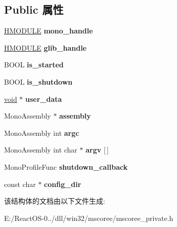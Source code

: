 \subsection*{Public 属性}
\begin{DoxyCompactItemize}
\item 
\mbox{\label{structloaded__mono_a03e35068e42b73f60f08e9fbd91322c6}} 
\hyperlink{interfacevoid}{H\+M\+O\+D\+U\+LE} {\bfseries mono\+\_\+handle}
\item 
\mbox{\label{structloaded__mono_a2002cc65b00678cf402811d2d275a964}} 
\hyperlink{interfacevoid}{H\+M\+O\+D\+U\+LE} {\bfseries glib\+\_\+handle}
\item 
\mbox{\label{structloaded__mono_a7f886657b57a08da32de1821763a6885}} 
B\+O\+OL {\bfseries is\+\_\+started}
\item 
\mbox{\label{structloaded__mono_abcb75500e86ce54e305d48c2e7253903}} 
B\+O\+OL {\bfseries is\+\_\+shutdown}
\item 
\mbox{\label{structloaded__mono_a6e7f0d3fd072b323cf52f0323251b1ca}} 
\hyperlink{interfacevoid}{void} $\ast$ {\bfseries user\+\_\+data}
\item 
\mbox{\label{structloaded__mono_a5015f8ab7cae14e99caaa39a347b5714}} 
Mono\+Assembly $\ast$ {\bfseries assembly}
\item 
\mbox{\label{structloaded__mono_a0bf7db9915e35dadefc0a5eeae747364}} 
Mono\+Assembly int {\bfseries argc}
\item 
\mbox{\label{structloaded__mono_af841ee06b9752bbb0d461ec53c0b527e}} 
Mono\+Assembly int char $\ast$ {\bfseries argv} \mbox{[}$\,$\mbox{]}
\item 
\mbox{\label{structloaded__mono_a22be2db6fa7592262a5c61b93a963dfd}} 
Mono\+Profile\+Func {\bfseries shutdown\+\_\+callback}
\item 
\mbox{\label{structloaded__mono_ad0ffaad66973faef9230e49715a3d24c}} 
const char $\ast$ {\bfseries config\+\_\+dir}
\end{DoxyCompactItemize}


该结构体的文档由以下文件生成\+:\begin{DoxyCompactItemize}
\item 
E\+:/\+React\+O\+S-\/0../dll/win32/mscoree/mscoree\+\_\+private.\+h\end{DoxyCompactItemize}

